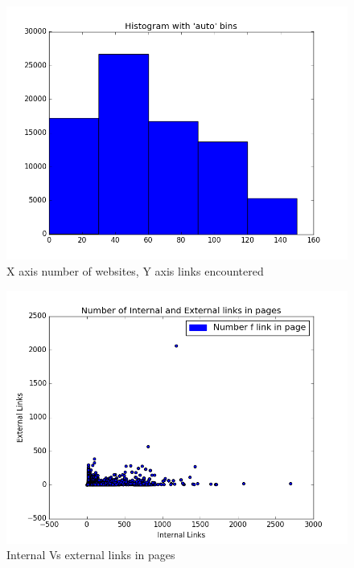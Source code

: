\documentclass{WeSTassignment}
\begin{document}
\begin{figure}[h]
  \centering
  \includegraphics{histogram.png}
   \caption{X axis number of websites, Y axis links encountered}
     \label{fig:dig} 
\end{figure}


\begin{figure}[h]
  \centering
  \includegraphics{scatter.png}
   \caption{Internal Vs external links in pages}
     \label{fig:dig} 
\end{figure}





\makefooter
\end{document}
